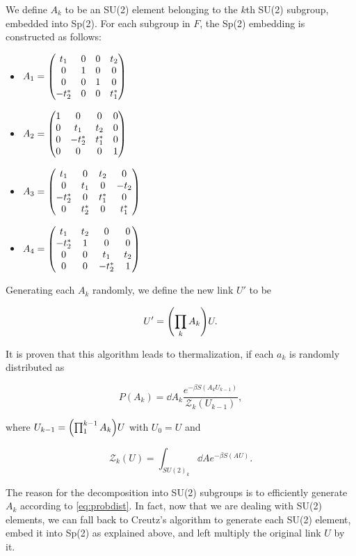 \documentclass[reqno,12pt]{article}
\numberwithin{equation}{section}
\begin{document}
We define $A_k$ to be an SU(2) element belonging to the $k$th SU(2) subgroup, embedded into Sp(2). For each subgroup in $F$,
the Sp(2) embedding is constructed as follows:
\begin{itemize}
	\item $A_1 = \mqty(
		t_1 & 0 & 0 & t_2 \\
		0 & 1 & 0 & 0 \\
		0 & 0 & 1 & 0 \\
		-t^*_2 & 0 & 0 & t^*_1 
		)$
	\item $A_2 = \mqty(
		1 & 0 & 0 & 0 \\
		0 & t_1 & t_2 & 0 \\
		0 & -t^*_2 & t^*_1 & 0 \\
		0 & 0 & 0 & 1 
		)$
	\item $A_3 = \mqty(
		t_1 & 0 & t_2 & 0 \\
		0 & t_1 & 0 & -t_2 \\
		-t_2^* & 0 & t^*_1 & 0 \\
		0 & t^*_2 & 0 & t^*_1 
		)$
	\item $A_4 = \mqty(
		t_1 & t_2 & 0 & 0 \\
		-t^*_2 & 1 & 0 & 0 \\
		0 & 0 & t_1 & t_2  \\
		0 & 0 & -t^*_2 & 1 
		)$
\end{itemize}

Generating each $A_k$ randomly, we define the new link $U'$ to be

\begin{equation}
	U' = \qty(\prod_k A_k) U.
\end{equation}

It is proven \cite{cabibbo} that this algorithm leads to thermalization, if each $a_k$ is randomly distributed as

\begin{equation} \label{eq:probdist}
	P(A_k) = \dd{A_k} \frac{e^{-\beta S(A_k U_{k-1})}}{\mathcal{Z}_k(U_{k-1})},
\end{equation}

where $U_{k-1} = \qty(\prod_1^{k-1}A_k) U$ with $U_0 = U$ and 

\begin{equation}
	\mathcal{Z}_k(U) = \int_{SU(2)_k} \dd{A} e^{-\beta S(AU)}.
\end{equation}


The reason for the decomposition into SU(2) subgroups is to efficiently generate $A_k$ according to 
\eqref{eq:probdist}. In fact, now that we are dealing with SU(2) elements, we can fall back to Creutz's
algorithm \cite{creutz} to generate each SU(2) element, embed it into Sp(2) as explained above, and left multiply
the original link $U$ by it. 
\end{document}
